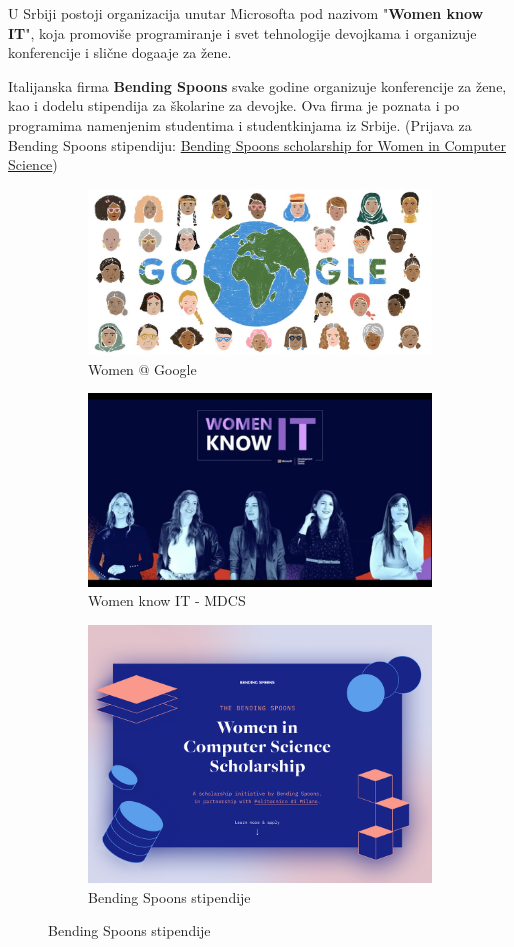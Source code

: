 \documentclass[12pt]{article}
\begin{document}
U Srbiji postoji organizacija unutar Microsofta pod nazivom "\textbf{Women know IT}", koja promoviše programiranje i svet tehnologije devojkama i organizuje konferencije i slične doga\dj aje za žene.

Italijanska firma \textbf{Bending Spoons} svake godine organizuje konferencije za žene, kao i dodelu stipendija za školarine za devojke. Ova firma je poznata i po programima namenjenim studentima i studentkinjama iz Srbije. (Prijava za Bending Spoons stipendiju: \href{https://scholarship.bendingspoons.com/}{Bending Spoons scholarship for Women in Computer Science})

\begin{figure}[htp]
    \centering
    \begin{subfigure}{.5\textwidth}
        \centering
        \includegraphics[width=0.7\linewidth]{google.png}
        \caption{Women @ Google}
    \end{subfigure}

    \begin{subfigure}{.5\textwidth}
    \centering
    \includegraphics[width=0.7\linewidth]{womenknowit.png}
    \caption{Women know IT - MDCS}
    \end{subfigure}

    \begin{subfigure}{.5\textwidth}
    \centering
    \includegraphics[width=0.7\linewidth]{bendingspoons.png}
    \caption{Bending Spoons stipendije}
    \end{subfigure}
\end{figure}
\end{document}
